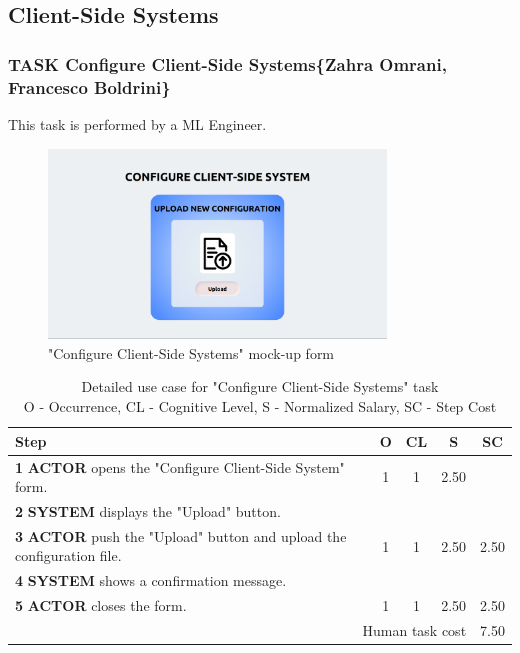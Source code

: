 \subsection{ Client-Side Systems}

\subsubsection{TASK Configure Client-Side Systems\{Zahra Omrani, Francesco Boldrini\}}
This task is performed by a ML Engineer.

\begin{figure}[H]
\centering
\includegraphics[width=0.8\textwidth]{figures/ui_configure_client-side.png}
\caption{"Configure Client-Side Systems" mock-up form}
\end{figure}

\begin{table}[H]
\centering
\begin{tabularx}{\textwidth}{|X|c|c|c|c|}
\hline
\textbf{Step} & \textbf{O} & \textbf{CL} & \textbf{S} & \textbf{SC} \\
\hline
\textbf{1} \textbf{ACTOR} opens the "Configure Client-Side System" form. & 1 &1 & 2.50 & \\
\hline
\textbf{2} \textbf{SYSTEM} displays the "Upload" button.& & & & \\
\hline
\textbf{3} \textbf{ACTOR} push the "Upload" button and upload the configuration file. & 1 & 1 & 2.50 & 2.50 \\
\hline
\textbf{4} \textbf{SYSTEM} shows a confirmation message. & & & & \\
\hline
\textbf{5} \textbf{ACTOR} closes the form. & 1 & 1 & 2.50 & 2.50 \\
\hline
\multicolumn{4}{|r|}{Human task cost} & 7.50 \\
\hline
\end{tabularx}
\caption{Detailed use case for "Configure Client-Side Systems" task\\ 
O - Occurrence, CL - Cognitive Level, S - Normalized Salary, SC - Step Cost}
\label{table:configure_client_side}
\end{table}


